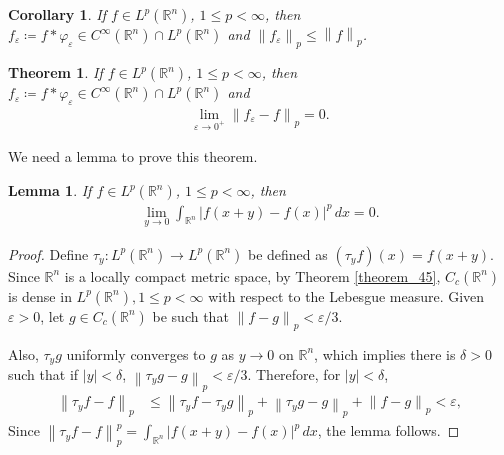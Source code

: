\documentclass[11pt]{book}
\newtheorem{theorem}{Theorem}[chapter]
\newtheorem{corollary}{Corollary}[theorem]
\newtheorem{lemma}{Lemma}[chapter]
\theoremstyle{definition}
\numberwithin{equation}{chapter}
\begin{document}
\medskip

\begin{corollary}
If $f \in L^p(\mathbb{R}^n)$, $1 \leq p < \infty$, then $f_{\varepsilon} \coloneqq f*\varphi_{\varepsilon} \in C^{\infty}(\mathbb{R}^n) \cap L^p(\mathbb{R}^n)$ and $\left\|f_{\varepsilon}\right\|_p \leq \left\|f\right\|_p$.
\end{corollary}

\medskip

\begin{theorem}\label{theorem_313}
If $f \in L^p(\mathbb{R}^n)$, $1 \leq p < \infty$, then $f_{\varepsilon} \coloneqq f*\varphi_{\varepsilon} \in C^{\infty}(\mathbb{R}^n) \cap L^p(\mathbb{R}^n)$ and 
\begin{align*}
    \lim_{\varepsilon\to 0^+} \left\|f_{\varepsilon} - f\right\|_p = 0.
\end{align*}
\end{theorem}

We need a lemma to prove this theorem.

\begin{lemma}\label{lemma_31}
If $f \in L^p(\mathbb{R}^n)$, $1 \leq p < \infty$, then
\begin{align*}
    \lim_{y\to 0} \int_{\mathbb{R}^n} \left|f(x+y) - f(x)\right|^p \,dx = 0.
\end{align*}
\end{lemma}
\begin{proof}
Define $\tau_y: L^p(\mathbb{R}^n) \to L^p(\mathbb{R}^n)$ be defined as $(\tau_y f)(x) = f(x+y)$. Since $\mathbb{R}^n$ is a locally compact metric space, by Theorem \ref{theorem_45}, $C_c(\mathbb{R}^n)$ is dense in $L^p(\mathbb{R}^n), 1 \leq p < \infty$ with respect to the Lebesgue measure. Given $\varepsilon > 0$, let $g \in C_c(\mathbb{R}^n)$ be such that $\left\|f - g\right\|_p < \varepsilon/3$.

Also, $\tau_y g$ uniformly converges to $g$ as $y \to 0$ on $\mathbb{R}^n$, which implies there is $\delta > 0$ such that if $\left|y\right| < \delta$, $\left\|\tau_y g - g\right\|_p < \varepsilon/3$. Therefore, for $\left|y\right| < \delta$,
\begin{align*}
    \left\|\tau_y f - f\right\|_p & \leq \left\|\tau_y f - \tau_y g\right\|_p + \left\|\tau_y g - g\right\|_p + \left\|f - g\right\|_p < \varepsilon,
\end{align*}
Since $\left\|\tau_y f - f\right\|_p^p = \int_{\mathbb{R}^n} \left|f(x+y) - f(x)\right|^p \,dx$, the lemma follows.
\end{proof}
\end{document}
